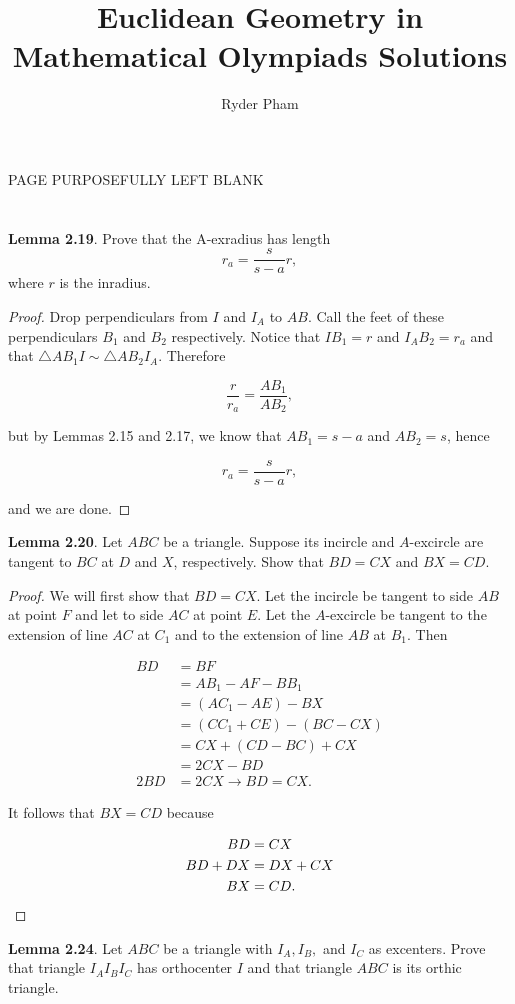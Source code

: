 \documentclass[letterpaper,oneside]{book}
\begin{document}
\title{Euclidean Geometry in Mathematical Olympiads Solutions}
\author{Ryder Pham}
\maketitle

\chapter{}
PAGE PURPOSEFULLY LEFT BLANK
\chapter{}
\textbf{Lemma 2.19}. Prove that the A-exradius has length
$$r_a = \frac{s}{s-a}r,$$
where $r$ is the inradius.

\begin{proof}
    Drop perpendiculars from $I$ and $I_A$ to $AB$. Call the feet of these perpendiculars $B_1$ and $B_2$ respectively. Notice that $IB_1 = r$ and $I_AB_2 = r_a$ and that $\triangle AB_1I \sim \triangle AB_2I_A$. Therefore 

$$\frac{r}{r_a} = \frac{AB_1}{AB_2},$$

but by Lemmas 2.15 and 2.17, we know that $AB_1 = s-a$ and $AB_2 = s$, hence 

$$r_a = \frac{s}{s-a}r,$$

and we are done.
\end{proof}

\textbf{Lemma 2.20}.   Let $ABC$ be a triangle. Suppose its incircle and $A$-excircle are tangent to $BC$ at $D$ and $X$, respectively. Show that $BD = CX$ and $BX = CD$. 

\begin{proof}  We will first show that $BD=CX$. Let the incircle be tangent to side $AB$ at point $F$ and let to side $AC$ at point $E$. Let the $A$-excircle be tangent to the extension of line $AC$ at $C_1$ and to the extension of line $AB$ at $B_1$. Then

\begin{align*}
BD &= BF \\
&= AB_1 - AF - BB_1 \\
&= (AC_1 - AE) - BX \\
&= (CC_1 + CE) - (BC - CX) \\
&= CX + (CD - BC) + CX \\
&= 2CX - BD \\
2BD&=2CX \rightarrow BD = CX.
\end{align*}

It follows that $BX=CD$ because

\begin{align*}
BD &= CX \\
BD + DX &= DX + CX \\
BX &= CD. \space 
\end{align*}
\end{proof}
  \textbf{Lemma 2.24}.   Let $ABC$ be a triangle with $I_A, I_B,$ and $I_C$ as excenters. Prove that triangle $I_AI_BI_C$ has orthocenter $I$ and that triangle $ABC$ is its orthic triangle.
\end{document}
